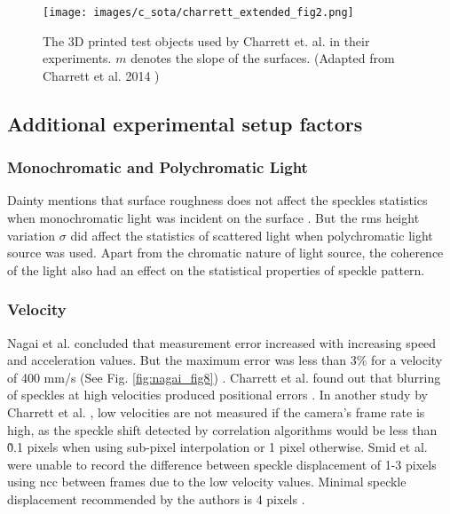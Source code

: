     \begin{figure}[h]
        \centering
        \texttt{[image: images/c\_sota/charrett\_extended\_fig2.png]}
        \caption{The 3D printed test objects used by Charrett et. al. in their experiments. $m$ denotes the slope of the surfaces. (Adapted from Charrett et al. 2014 \cite{charrett_extended_theory})}
        \label{fig:charrett_extended_fig2}
    \end{figure}

\subsection{Additional experimental setup factors}

    \subsubsection{Monochromatic and Polychromatic Light}
    Dainty mentions that surface roughness does not affect the speckles statistics when monochromatic light was incident on the surface \cite{dainty}. But the \gls{rms} height variation $\sigma$ did affect the statistics of scattered light when polychromatic light source was used. Apart from the chromatic nature of light source, the coherence of the light also had an effect on the statistical properties of speckle pattern.

    \subsubsection{Velocity}
    Nagai et al. concluded that measurement error increased with increasing speed and acceleration values. But the maximum error was less than 3\% for a velocity of 400 mm/s (See Fig. \ref{fig:nagai_fig8}) \cite{nagai}. Charrett et al. found out that blurring of speckles at high velocities produced positional errors \cite{charrett_2018}. In another study by Charrett et al. \cite{charrett_mars}, low velocities are not measured if the camera's frame rate is high, as the speckle shift detected by correlation algorithms would be less than \~0.1 pixels when using sub-pixel interpolation or 1 pixel otherwise. Smid et al. were unable to record the difference between speckle displacement of 1-3 pixels using \gls{ncc} between frames due to the low velocity values. Minimal speckle displacement recommended by the authors is 4 pixels \cite{smid_2007}.
    
